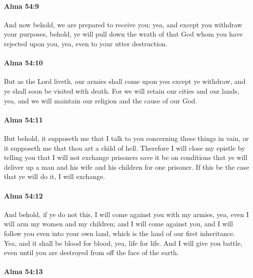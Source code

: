 		\paragraph{Alma 54:9} %
			\label{ALMA-54-9}

			And now behold, we are prepared to receive you;
			yea, and except you withdraw your purposes,
			behold, ye will pull down
			the wrath of that God whom you have rejected
			upon you,
			yea, even to your utter destruction.

		\paragraph{Alma 54:10} %
			\label{ALMA-54-10}

			But as the Lord liveth,
			our armies shall come upon you except ye withdraw,
			and ye shall soon be visited with death.
			For we will retain our cities and our lands,
			yea, and we will maintain our religion and the cause of our God.

		\paragraph{Alma 54:11} %
			\label{ALMA-54-11}

			But behold, it supposeth me that I talk to you concerning these things in vain,
			or it supposeth me that thou art a child of hell.
			Therefore I will close my epistle by telling you
			that I will not exchange prisoners save it be on conditions
			that ye will deliver up a man and his wife and his children for one prisoner.
			If this be the case that ye will do it, I will exchange.

		\paragraph{Alma 54:12} %
			\label{ALMA-54-12}

			And behold, if ye do not this,
			I will come against you with my armies,
			yea, even I will arm my women and my children;
			and I will come against you,
			and I will follow you even into your own land,
			which is the land of our first inheritance.
			Yea, and it shall be blood for blood, yea, life for life.
			And I will give you battle,
			even until you are destroyed from off the face of the earth.

		\paragraph{Alma 54:13} %
			\label{ALMA-54-13}

